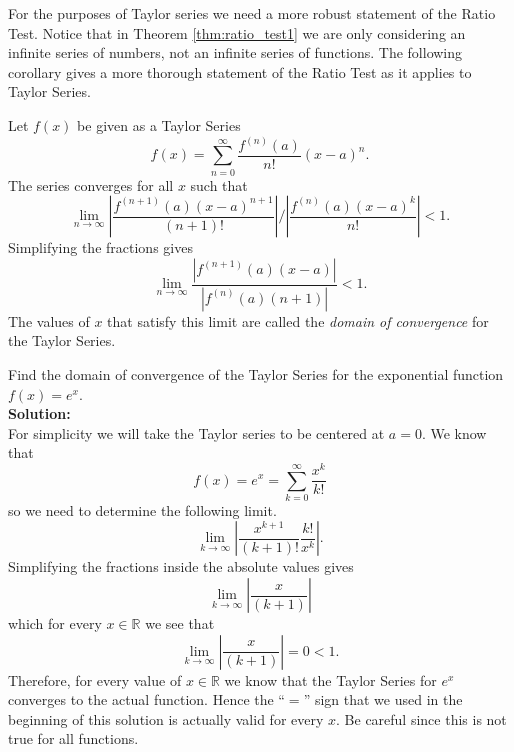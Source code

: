 For the purposes of Taylor series we need a more robust statement of the Ratio Test.
Notice that in Theorem \ref{thm:ratio_test1} we are only considering an infinite series of
numbers, not an infinite series of functions.  The following corollary gives a more
thorough statement of the Ratio Test as it applies to Taylor Series.

\begin{cor}
    Let $f(x)$ be given as a Taylor Series 
    \[ f(x) = \sum_{n=0}^\infty \frac{f^{(n)}(a)}{n!}(x-a)^n. \]
    The series converges for all $x$ such that 
    \[ \lim_{n \to \infty} \left| \frac{f^{(n+1)}(a) (x-a)^{n+1}}{(n+1)!} \right| \Big/
    \left| \frac{f^{(n)}(a) (x-a)^k}{n!} \right|  < 1. \]
    Simplifying the fractions gives 
    \[ \lim_{n \to \infty}  \frac{|f^{(n+1)}(a) (x-a)|}{|f^{(n)}(a) (n+1)| } <1. \]
    The values of $x$ that satisfy this limit are called the {\it domain of convergence} for
    the Taylor Series.  
\end{cor}

\begin{example}\label{ex:Taylor1}
    Find the domain of convergence of the Taylor Series for the exponential function $f(x)
    = e^x$. \\{\bf Solution:} \\
    For simplicity we will take the Taylor series to be centered at $a=0$.  We know that 
    \[ f(x) = e^x = \sum_{k=0}^\infty \frac{x^k}{k!} \]
    so we need to determine the following limit.
    \[ \lim_{k \to \infty} \left| \frac{x^{k+1}}{(k+1)!} \frac{k!}{x^k} \right|. \]
    Simplifying the fractions inside the absolute values gives
    \[ \lim_{k \to \infty} \left| \frac{x}{(k+1)} \right| \]
    which for every $x \in \mathbb{R}$ we see that 
    \[ \lim_{k \to \infty} \left| \frac{x}{(k+1)} \right| = 0 < 1. \]
    Therefore, for every value of $x \in \mathbb{R}$ we know that the Taylor Series for
    $e^x$ converges to the actual function. Hence the ``$=$'' sign that we used in the
    beginning of this solution is actually valid for every $x$.  Be careful since this is
    not true for all functions.
\end{example}


